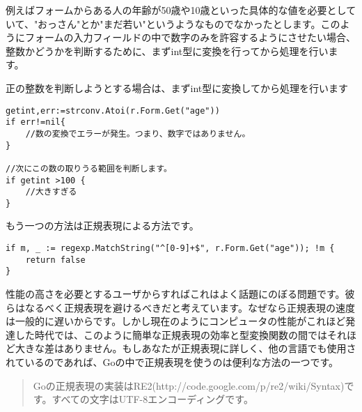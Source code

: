 例えばフォームからある人の年齢が50歳や10歳といった具体的な値を必要としていて、"おっさん"とか"まだ若い"というようなものでなかったとします。このようにフォームの入力フィールドの中で数字のみを許容するようにさせたい場合、整数かどうかを判断するために、まずint型に変換を行ってから処理を行います。

正の整数を判断しようとする場合は、まずint型に変換してから処理を行います

\begin{lstlisting}[numbers=none]
getint,err:=strconv.Atoi(r.Form.Get("age"))
if err!=nil{
    //数の変換でエラーが発生。つまり、数字ではありません。
}

//次にこの数の取りうる範囲を判断します。
if getint >100 {
    //大きすぎる
}
\end{lstlisting}

もう一つの方法は正規表現による方法です。

\begin{lstlisting}[numbers=none]
if m, _ := regexp.MatchString("^[0-9]+$", r.Form.Get("age")); !m {
    return false
}
\end{lstlisting}

性能の高さを必要とするユーザからすればこれはよく話題にのぼる問題です。彼らはなるべく正規表現を避けるべきだと考えています。なぜなら正規表現の速度は一般的に遅いからです。しかし現在のようにコンピュータの性能がこれほど発達した時代では、このように簡単な正規表現の効率と型変換関数の間ではそれほど大きな差はありません。もしあなたが正規表現に詳しく、他の言語でも使用されているのであれば、Goの中で正規表現を使うのは便利な方法の一つです。

\begin{quote}
Goの正規表現の実装はRE2(http://code.google.com/p/re2/wiki/Syntax)です。すべての文字はUTF-8エンコーディングです。
\end{quote}


